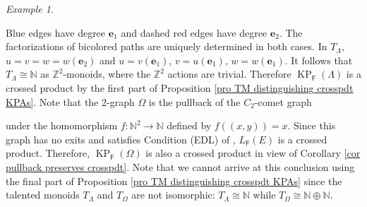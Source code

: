 \documentclass[a4paper,reqno,12pt]{amsart}
\numberwithin{equation}{section}
\theoremstyle{definition}
\theoremstyle{remark}
\newtheorem{example}[thm]{Example}
\newcommand{\KP}{\operatorname{KP}}
\begin{document}
\begin{example}
\begin{center}
\end{center}
Blue edges have degree $\mathbf{e}_1$ and dashed red edges have degree $\mathbf{e}_2$. The factorizations of bicolored paths are uniquely determined in both cases. In $T_\Lambda$, $u=v=w=w(\mathbf{e}_2)$ and $u=v(\mathbf{e}_1)$, $v=u(\mathbf{e}_1)$, $w=w(\mathbf{e}_1)$. It follows that $T_\Lambda\cong \mathbb{N}$ as $\mathbb{Z}^2$-monoids, where the $\mathbb{Z}^2$ actions are trivial. Therefore $\KP_\mathsf{F}(\Lambda)$ is a crossed product by the first part of Proposition \ref{pro TM distinguishing crosspdt KPAs}. Note that the $2$-graph $\Omega$ is the pullback of the $C_2$-comet graph 
\begin{center}
\end{center}
under the homomorphism $f:\mathbb{N}^2\longrightarrow \mathbb{N}$ defined by $f((x,y))=x$. Since this graph has no exits and satisfies Condition (EDL) of \cite{Vas}, $L_\mathsf{F}(E)$ is a crossed product. Therefore, $\KP_\mathsf{F}(\Omega)$ is also a crossed product in view of Corollary \ref{cor pullback preserves crosspdt}. Note that we cannot arrive at this conclusion using the final part of Proposition \ref{pro TM distinguishing crosspdt KPAs} since the talented monoids $T_\Lambda$ and $T_\Omega$ are not isomorphic: $T_\Lambda\cong \mathbb{N}$ while $T_\Omega\cong \mathbb{N}\oplus \mathbb{N}$.  
\end{example}
\end{document}
